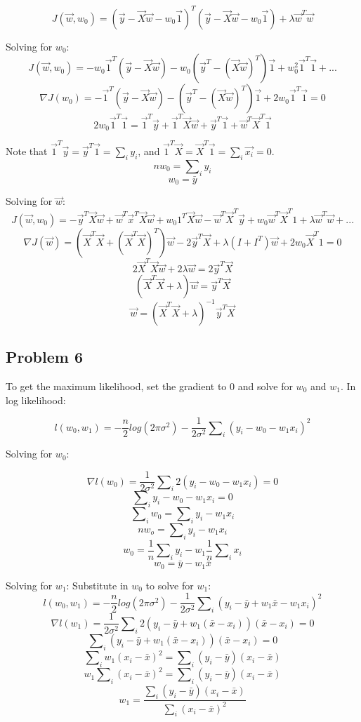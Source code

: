 \documentclass{article}
\begin{document}
\[J(\vec{w}, w_0) = (\vec{y} - \vec{X} \vec{w} - w_0 \vec{1})^{T}(\vec{y} - \vec{X} \vec{w} - w_0 \vec{1}) + \lambda \vec{w}^{T} \vec{w}\]

Solving for \(w_0\):
\[J(\vec{w}, w_0) = -w_0\vec{1}^{T}(\vec{y}-\vec{X}\vec{w})-w_0(\vec{y}^{T}-(\vec{X}\vec{w})^{T})\vec{1}+w_0^2\vec{1}^{T}\vec{1} + ...\]
\[\nabla J(w_0) = -\vec{1}^{T}(\vec{y}-\vec{X}\vec{w})-(\vec{y}^{T}-(\vec{X}\vec{w})^{T})\vec{1}+2w_0\vec{1}^{T}\vec{1} = 0\]
\[2w_0\vec{1}^{T}\vec{1} = \vec{1}^{T}\vec{y}+\vec{1}^{T}\vec{X}\vec{w}+\vec{y}^{T}\vec{1}+\vec{w}^{T}\vec{X}^{T}\vec{1}\]

Note that
\(\vec{1}^{T}\vec{y} = \vec{y}^{T}\vec{1} = \sum\nolimits_i y_i\), and
\(\vec{1}^{T}\vec{X} = \vec{X}^{T}\vec{1} = \sum\nolimits_i \vec{x_i} = 0\).
\[nw_0 = \sum\nolimits_i y_i\] \[w_0 = \bar{y}\]

Solving for \(\vec{w}\):
\[J(\vec{w}, w_0) = -\vec{y}^{T}\vec{X}\vec{w} + \vec{w}^{T}\vec{x}^{T}\vec{X}\vec{w} + w_0 1^{T}\vec{X}\vec{w} - \vec{w}^{T}\vec{X}^{T}\vec{y} + w_0 \vec{w}^{T}\vec{X}^{T}1 + \lambda\vec{w}^{T}\vec{w} + ...\]
\[\nabla J(\vec{w}) = (\vec{X}^{T}\vec{X} + (\vec{X}^{T}\vec{X})^{T})\vec{w} - 2\vec{y}^{T}\vec{X} + \lambda(I+I^{T})\vec{w} + 2 w_0 \vec{X}^{T}1 = 0\]
\[2\vec{X}^{T}\vec{X}\vec{w} + 2\lambda\vec{w} = 2\vec{y}^{T}\vec{X}\]
\[(\vec{X}^{T}\vec{X} + \lambda)\vec{w} = \vec{y}^{T}\vec{X}\]
\[\vec{w} = (\vec{X}^{T}\vec{X} + \lambda)^{-1}\vec{y}^{T}\vec{X}\]

    \subsection{Problem 6}\label{problem-6}

To get the maximum likelihood, set the gradient to 0 and solve for
\(w_0\) and \(w_1\). In log likelihood:

\[l(w_0, w_1) = - \frac{n}{2} log(2 \pi \sigma ^{2}) - \frac{1}{2 \sigma ^{2}} \sum\nolimits_{i} (y_i - w_0 - w_1 x_i)^2 \]

Solving for \(w_0\):

\[\nabla l(w_0) = \frac{1}{2 \sigma ^{2}} \sum\nolimits_{i} 2(y_i - w_0 - w_1 x_i) = 0\]
\[\sum\nolimits_{i} y_i - w_0 - w_1 x_i = 0\]
\[\sum\nolimits_{i} w_0 = \sum\nolimits_{i} y_i - w_1 x_i\]
\[n w_o = \sum\nolimits_{i} y_i - w_1 x_i\]
\[w_0 = \frac{1}{n} \sum\nolimits_{i} y_i - w_1 \frac{1}{n} \sum\nolimits_{i} x_i\]
\[w_0 = \bar{y} - w_1 \bar{x}\]

Solving for \(w_1\): Substitute in \(w_0\) to solve for \(w_1\):
\[l(w_0, w_1) = - \frac{n}{2} log(2 \pi \sigma ^{2}) - \frac{1}{2 \sigma ^{2}} \sum\nolimits_{i} (y_i - \bar{y} + w_1 \bar{x} - w_1 x_i)^2 \]
\[\nabla l(w_1) = \frac{1}{2 \sigma ^{2}} \sum\nolimits_{i} 2(y_i - \bar{y} + w_1 (\bar{x} - x_i))(\bar{x} - x_i) = 0\]
\[\sum\nolimits_{i} (y_i - \bar{y} +w_1 (\bar{x} - x_i))(\bar{x} - x_i) = 0\]
\[\sum\nolimits_{i} w_1 (x_i - \bar{x})^2 = \sum\nolimits_{i} (y_i - \bar{y})(x_i - \bar{x})\]
\[w_1 \sum\nolimits_{i} (x_i - \bar{x})^2 = \sum\nolimits_{i} (y_i - \bar{y})(x_i - \bar{x})\]
\[w_1 = \frac{\sum\nolimits_{i} (y_i - \bar{y})(x_i - \bar{x})}{\sum\nolimits_{i} (x_i - \bar{x})^2}\]
\end{document}
